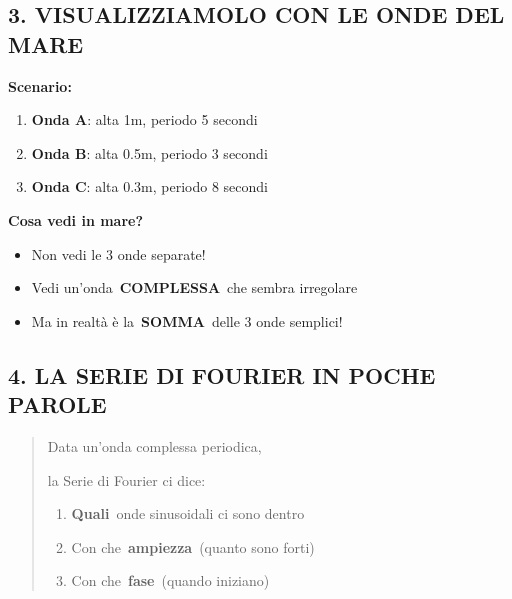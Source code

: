 \documentclass[
]{article}
\providecommand{\tightlist}{%
  \setlength{\itemsep}{0pt}\setlength{\parskip}{0pt}}
\begin{document}
\hypertarget{visualizziamolo-con-le-onde-del-mare}{%
\subsection{\texorpdfstring{\textbf{3. VISUALIZZIAMOLO CON LE ONDE DEL MARE}}{3. VISUALIZZIAMOLO CON LE ONDE DEL MARE}}\label{visualizziamolo-con-le-onde-del-mare}}

\textbf{Scenario:}

\begin{enumerate}
\def\labelenumi{\arabic{enumi}.}
\tightlist
\item
  \textbf{Onda A}: alta 1m, periodo 5 secondi
\item
  \textbf{Onda B}: alta 0.5m, periodo 3 secondi
\item
  \textbf{Onda C}: alta 0.3m, periodo 8 secondi
\end{enumerate}

\textbf{Cosa vedi in mare?}

\begin{itemize}
\tightlist
\item
  Non vedi le 3 onde separate!
\item
  Vedi un'onda~\textbf{COMPLESSA}~che sembra irregolare
\item
  Ma in realtà è la~\textbf{SOMMA}~delle 3 onde semplici!
\end{itemize}

\hypertarget{la-serie-di-fourier-in-poche-parole}{%
\subsection{\texorpdfstring{\textbf{4. LA SERIE DI FOURIER IN POCHE PAROLE}}{4. LA SERIE DI FOURIER IN POCHE PAROLE}}\label{la-serie-di-fourier-in-poche-parole}}

\begin{quote}
Data un'onda complessa periodica,

la Serie di Fourier ci dice:

\begin{enumerate}
\def\labelenumi{\arabic{enumi}.}
\tightlist
\item
  \textbf{Quali}~onde sinusoidali ci sono dentro
\item
  Con che~\textbf{ampiezza}~(quanto sono forti)
\item
  Con che~\textbf{fase}~(quando iniziano)
\end{enumerate}
\end{quote}
\end{document}
